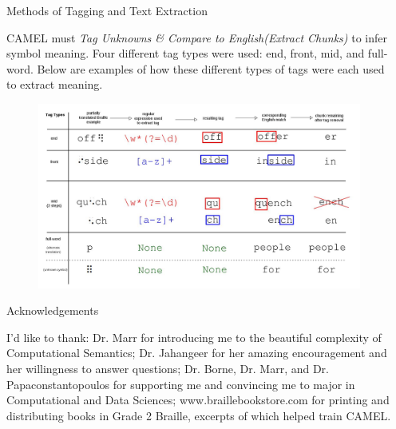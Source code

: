 \documentclass[final]{beamer}
\begin{document}
\begin{frame}{}
\begin{columns}[t]
\begin{column}{.3\linewidth}
    \begin{block}{{\small Methods of Tagging and Text Extraction}}
{\tiny
CAMEL must \textit{Tag Unknowns \& Compare to English(Extract Chunks)}  to infer symbol meaning. Four different tag types were used: end, front, mid, and full-word. Below are examples of how these different types of tags were each used to extract meaning. \par}
\begin{figure}\centering
	\includegraphics[width=\columnwidth]{taggtypes1}
	\end{figure}
\vspace{-30pt} 
\end{block}
\begin{block}{{\tiny Acknowledgements}}
\vspace{-10pt}  
{\tiny I'd like to thank: Dr. Marr for introducing me to the beautiful complexity of Computational Semantics; Dr. Jahangeer for her amazing encouragement and her willingness to answer questions; Dr. Borne, Dr. Marr, and Dr. Papaconstantopoulos for supporting me and convincing me to major in Computational and Data Sciences; www.braillebookstore.com for printing and distributing books in Grade 2 Braille, excerpts of which helped train CAMEL.\par}
\end{block}




  \end{column}
  \begin{column}{.3\linewidth}
   

\end{column}
\end{columns}
\end{frame}
\end{document}
